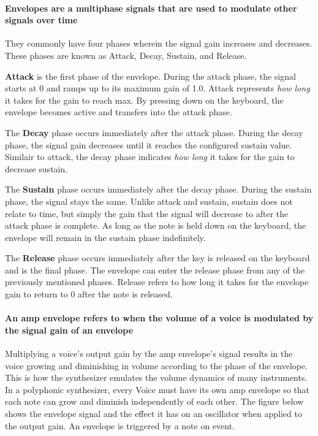 \documentclass[acmlarge,screen]{acmart}
\begin{document}
	\paragraph{Envelopes are a multiphase signals that are used to modulate other signals over time} They commonly have four phases wherein the signal gain increases and decreases. These phases are known as Attack, Decay, Sustain, and Release.
	
	\textbf{Attack} is the first phase of the envelope. During the attack phase, the signal starts at 0 and ramps up to its maximum gain of 1.0. Attack represents \textit{how long} it takes for the gain to reach max. By pressing down on the keyboard, the envelope becomes active and transfers into the attack phase.
	
	The \textbf{Decay} phase occurs immediately after the attack phase. During the decay phase, the signal gain decreases until it reaches the configured sustain value. Similair to attack, the decay phase indicates \textit{how long} it takes for the gain to decrease sustain.
	
	The \textbf{Sustain} phase occurs immediately after the decay phase. During the sustain phase, the signal stays the same. Unlike attack and sustain, sustain does not relate to time, but simply the gain that the signal will decrease to after the attack phase is complete. As long as the note is held down on the keyboard, the envelope will remain in the sustain phase indefinitely.
	
	The \textbf{Release} phase occurs immediately after the key is released on the keyboard and is the final phase. The envelope can enter the release phase from any of the previously mentioned phases. Release refers to how long it takes for the envelope gain to return to 0 after the note is released. \cite{hass_2021}
	
	\paragraph{An amp envelope refers to when the volume of a voice is modulated by the signal gain of an envelope} Multiplying a voice's output gain by the amp envelope's signal results in the voice growing and diminishing in volume according to the phase of the envelope. This is how the synthesizer emulates the volume dynamics of many instruments. In a polyphonic synthesizer, every Voice must have its own amp envelope so that each note can grow and diminish independently of each other. The figure below shows the envelope signal and the effect it has on an oscillator when applied to the output gain. An envelope is triggered by a note on event. 
	
\end{document}
